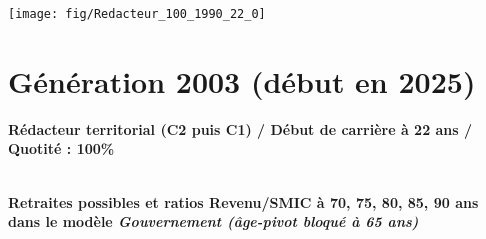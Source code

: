  \vspace{0.1cm} 

 {\hspace{-2.2cm}\texttt{[image: fig/Redacteur\_100\_1990\_22\_0]}} 

\newpage 
 
\section{Génération 2003 (début en 2025)\label{Redacteur_100_2003_22_0}} 
 
{\bf \noindent Rédacteur territorial (C2 puis C1) / Début de carrière à 22 ans / Quotité : 100\%}  ~ 

 ~\\{\bf \noindent Retraites possibles et ratios Revenu/SMIC à 70, 75, 80, 85, 90 ans dans le modèle \emph{Gouvernement (âge-pivot bloqué à 65 ans)}}  
 
